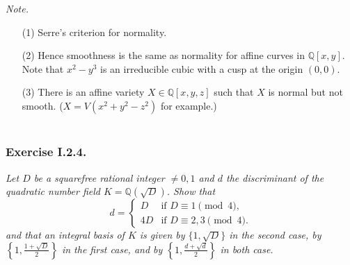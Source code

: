 \documentclass{article}
\begin{document}
\emph{Note.}
\begin{enumerate}
\item[(1)]
  Serre's criterion for normality.

\item[(2)]
  Hence smoothness is the same as normality for affine curves in $\mathbb{Q}[x,y]$.
  Note that $x^2-y^3$ is an irreducible cubic with a cusp at the origin $(0,0)$.

\item[(3)]
  There is an affine variety $X \in \mathbb{Q}[x,y,z]$ such that
  $X$ is normal but not smooth.
  ($X = V(x^2 + y^2 - z^2)$ for example.) \\\\
\end{enumerate}






\subsubsection*{Exercise I.2.4.}
\emph{Let $D$ be a squarefree rational integer $\neq 0, 1$ and
$d$ the discriminant of the quadratic number field $K = \mathbb{Q}(\sqrt{D})$.
Show that
\begin{equation*}
  d = \begin{cases}
    D  & \text{if $D \equiv 1 \pmod 4$,}\\
    4D & \text{if $D \equiv 2, 3 \pmod 4$.}
  \end{cases}
\end{equation*}
and that an integral basis of $K$ is given by $\{1, \sqrt{D}\}$ in the second case,
by $\left\{ 1, \frac{1+\sqrt{D}}{2} \right\}$ in the first case,
and by $\left\{ 1, \frac{d+\sqrt{d}}{2} \right\}$ in both case.} \\
\end{document}
